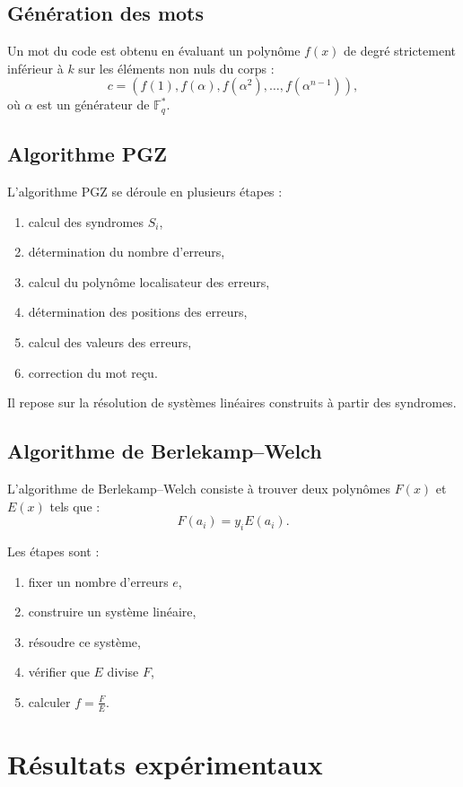 \documentclass[a4paper,11pt]{article}
\begin{document}
\subsection{Génération des mots}

Un mot du code est obtenu en évaluant un polynôme $f(x)$ de degré strictement inférieur à $k$ sur les éléments non nuls du corps :
\[
c = (f(1), f(\alpha), f(\alpha^2), \dots, f(\alpha^{n-1})),
\]
où $\alpha$ est un générateur de $\mathbb{F}_q^*$.

\subsection{Algorithme PGZ}

L'algorithme PGZ se déroule en plusieurs étapes :
\begin{enumerate}
    \item calcul des syndromes $S_i$,
    \item détermination du nombre d'erreurs,
    \item calcul du polynôme localisateur des erreurs,
    \item détermination des positions des erreurs,
    \item calcul des valeurs des erreurs,
    \item correction du mot reçu.
\end{enumerate}

Il repose sur la résolution de systèmes linéaires construits à partir des syndromes.

\subsection{Algorithme de Berlekamp--Welch}

L'algorithme de Berlekamp--Welch consiste à trouver deux polynômes $F(x)$ et $E(x)$ tels que :
\[
F(a_i) = y_i E(a_i).
\]

Les étapes sont :
\begin{enumerate}
    \item fixer un nombre d'erreurs $e$,
    \item construire un système linéaire,
    \item résoudre ce système,
    \item vérifier que $E$ divise $F$,
    \item calculer $f = \frac{F}{E}$.
\end{enumerate}

\section{Résultats expérimentaux}
\end{document}
